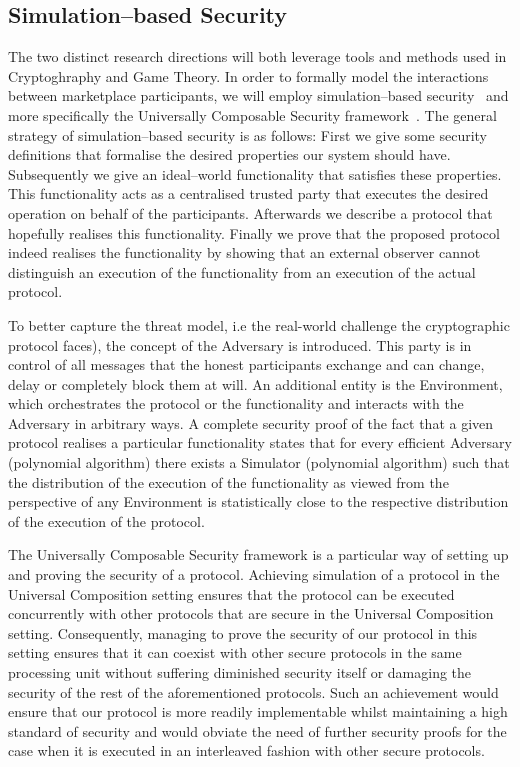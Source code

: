 \subsection{Simulation--based Security}
  The two distinct research directions will both leverage tools and methods used in
  Cryptoghraphy and Game Theory. In order to formally model the interactions between
  marketplace participants, we will employ simulation--based security~\cite{simulate}
  and more specifically the Universally Composable Security framework~\cite{uc}. The
  general strategy of simulation--based security is as follows: First we give some
  security definitions that formalise the desired properties our system should have.
  Subsequently we give an ideal--world functionality that satisfies these properties.
  This functionality acts as a centralised trusted party that executes the desired
  operation on behalf of the participants. Afterwards we describe a protocol that
  hopefully realises this functionality. Finally we prove that the proposed protocol
  indeed realises the functionality by showing that an external observer cannot
  distinguish an execution of the functionality from an execution of the actual
  protocol.

  To better capture the threat model, i.e the real-world challenge the cryptographic
  protocol faces), the concept of the Adversary is introduced. This party is in control of
  all messages that the honest participants exchange and can change, delay or completely
  block them at will. An additional entity is the Environment, which orchestrates the
  protocol or the functionality and interacts with the Adversary in arbitrary ways. A
  complete security proof of the fact that a given protocol realises a particular
  functionality states that for every efficient Adversary (polynomial algorithm) there
  exists a Simulator (polynomial algorithm) such that the distribution of the execution of
  the functionality as viewed from the perspective of any Environment is statistically
  close to the respective distribution of the execution of the protocol.

  The Universally Composable Security framework is a particular way of setting up and
  proving the security of a protocol. Achieving simulation of a protocol in the
  Universal Composition setting ensures that the protocol can be executed concurrently
  with other protocols that are secure in the Universal Composition setting.
  Consequently, managing to prove the security of our protocol in this setting ensures
  that it can coexist with other secure protocols in the same processing unit without
  suffering diminished security itself or damaging the security of the rest of the
  aforementioned protocols. Such an achievement would ensure that our protocol is more
  readily implementable whilst maintaining a high standard of security and would obviate
  the need of further security proofs for the case when it is executed in an interleaved
  fashion with other secure protocols.
